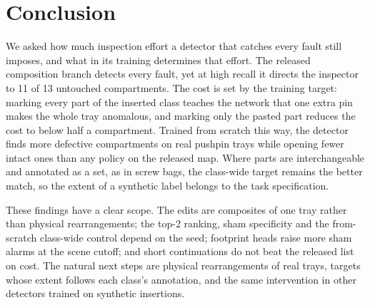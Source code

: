 \section{Conclusion}
\label{sec:conclusion}
\label{sec:discussion}
We asked how much inspection effort a detector that catches every fault still imposes, and what in its training determines that effort. The released composition branch detects every fault, yet at high recall it directs the inspector to 11 of 13 untouched compartments. The cost is set by the training target: marking every part of the inserted class teaches the network that one extra pin makes the whole tray anomalous, and marking only the pasted part reduces the cost to below half a compartment. Trained from scratch this way, the detector finds more defective compartments on real pushpin trays while opening fewer intact ones than any policy on the released map. Where parts are interchangeable and annotated as a set, as in screw bags, the class-wide target remains the better match, so the extent of a synthetic label belongs to the task specification.

These findings have a clear scope. The edits are composites of one tray rather than physical rearrangements; the top-2 ranking, sham specificity and the from-scratch class-wide control depend on the seed; footprint heads raise more sham alarms at the scene cutoff; and short continuations do not beat the released list on cost. The natural next steps are physical rearrangements of real trays, targets whose extent follows each class's annotation, and the same intervention in other detectors trained on synthetic insertions.
